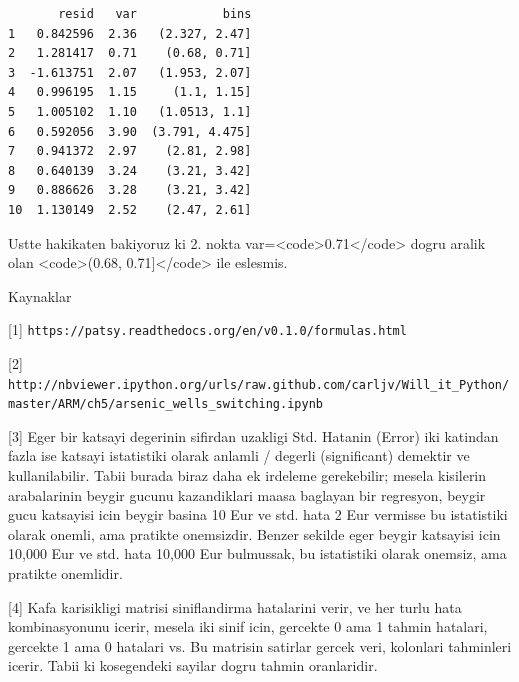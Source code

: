 \documentclass[12pt,fleqn]{article}\usepackage{../common}
\begin{document}
\begin{verbatim}
       resid   var            bins
1   0.842596  2.36   (2.327, 2.47]
2   1.281417  0.71    (0.68, 0.71]
3  -1.613751  2.07   (1.953, 2.07]
4   0.996195  1.15     (1.1, 1.15]
5   1.005102  1.10   (1.0513, 1.1]
6   0.592056  3.90  (3.791, 4.475]
7   0.941372  2.97    (2.81, 2.98]
8   0.640139  3.24    (3.21, 3.42]
9   0.886626  3.28    (3.21, 3.42]
10  1.130149  2.52    (2.47, 2.61]
\end{verbatim}

Ustte hakikaten bakiyoruz ki 2. nokta var=<code>0.71</code> dogru
aralik olan <code>(0.68, 0.71]</code> ile eslesmis.

Kaynaklar

[1] \verb!https://patsy.readthedocs.org/en/v0.1.0/formulas.html!

[2] \verb!http://nbviewer.ipython.org/urls/raw.github.com/carljv/Will_it_Python/master/ARM/ch5/arsenic_wells_switching.ipynb!

[3] Eger bir katsayi degerinin sifirdan uzakligi Std. Hatanin (Error) iki
katindan fazla ise katsayi istatistiki olarak anlamli / degerli
(significant) demektir ve kullanilabilir. Tabii burada biraz daha ek
irdeleme gerekebilir; mesela kisilerin arabalarinin beygir gucunu
kazandiklari maasa baglayan bir regresyon, beygir gucu katsayisi icin
beygir basina 10 Eur ve std. hata 2 Eur vermisse bu istatistiki olarak
onemli, ama pratikte onemsizdir. Benzer sekilde eger beygir katsayisi icin
10,000 Eur ve std. hata 10,000 Eur bulmussak, bu istatistiki olarak
onemsiz, ama pratikte onemlidir.

[4] Kafa karisikligi matrisi siniflandirma hatalarini verir, ve her turlu
hata kombinasyonunu icerir, mesela iki sinif icin, gercekte 0 ama 1 tahmin
hatalari, gercekte 1 ama 0 hatalari vs. Bu matrisin satirlar gercek veri,
kolonlari tahminleri icerir. Tabii ki kosegendeki sayilar dogru tahmin
oranlaridir.
\end{document}
